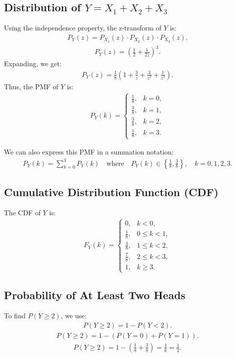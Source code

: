 \documentclass[journal]{IEEEtran}
\begin{document}
\subsection{Distribution of $ Y = X_1 + X_2 + X_3 $}
Using the independence property, the z-transform of $Y$ is:
\begin{align}
P_Y(z) = P_{X_1}(z) \cdot P_{X_2}(z) \cdot P_{X_3}(z).
\end{align}
\begin{align}
P_Y(z) = \left(\frac{1}{2} + \frac{1}{2z}\right)^3.
\end{align}
Expanding, we get:
\begin{align}
P_Y(z) = \frac{1}{8} \left(1 + \frac{3}{z} + \frac{3}{z^2} + \frac{1}{z^3}\right).
\end{align}
Thus, the PMF of $Y$ is:
\begin{align}
P_{Y}(k) =
\begin{cases}
\frac{1}{8}, & k = 0, \\
\frac{3}{8}, & k = 1, \\
\frac{3}{8}, & k = 2, \\
\frac{1}{8}, & k = 3.
\end{cases}
\end{align}

We can also express this PMF in a summation notation:
\begin{align}
P_Y(k) = \sum_{k=0}^{3} P_Y(k) \quad \text{where} \quad P_Y(k) \in \left\{ \frac{1}{8}, \frac{3}{8} \right\}, \quad k = 0, 1, 2, 3.
\end{align}

\subsection{Cumulative Distribution Function (CDF)}
The CDF of $Y$ is:
\begin{align}
F_Y(k) =
\begin{cases}
0, & k < 0, \\
\frac{1}{8}, & 0 \leq k < 1, \\
\frac{4}{8}, & 1 \leq k < 2, \\
\frac{7}{8}, & 2 \leq k < 3, \\
1, & k \geq 3.
\end{cases}
\end{align}

\subsection{Probability of At Least Two Heads}
To find $ P(Y \geq 2) $, we use:
\begin{align}
P(Y \geq 2) = 1 - P(Y < 2).
\end{align}
\begin{align}
P(Y \geq 2) = 1 - \left( P(Y = 0) + P(Y = 1) \right).
\end{align}
\begin{align}
P(Y \geq 2) = 1 - \left( \frac{1}{8} + \frac{3}{8} \right) = \frac{4}{8} = \frac{1}{2}.
\end{align}
\end{document}
